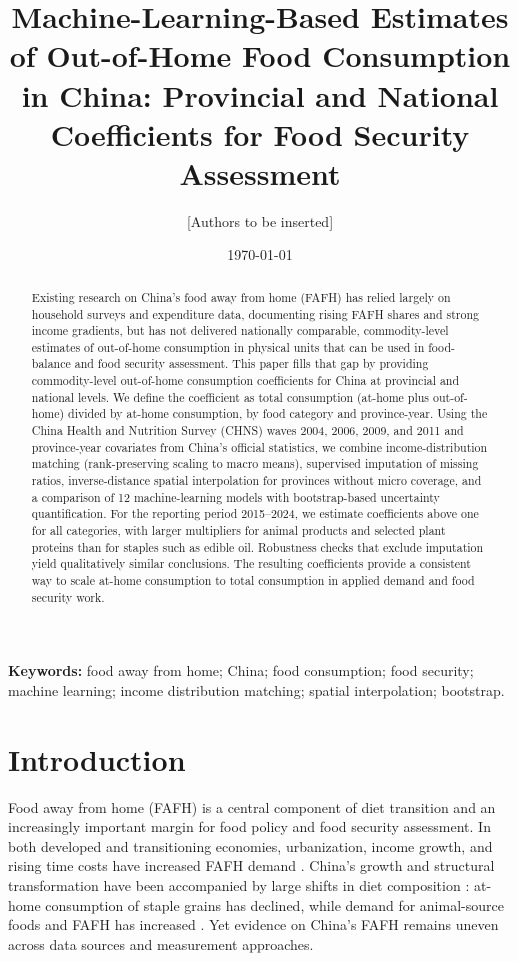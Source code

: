 \documentclass[12pt,a4paper]{article}
\title{Machine-Learning-Based Estimates of Out-of-Home Food Consumption in China: Provincial and National Coefficients for Food Security Assessment}
\author{[Authors to be inserted]}
\date{\today}
\begin{document}
\maketitle

\begin{abstract}
Existing research on China’s food away from home (FAFH) has relied largely on household surveys and expenditure data, documenting rising FAFH shares and strong income gradients, but has not delivered nationally comparable, commodity-level estimates of out-of-home consumption in physical units that can be used in food-balance and food security assessment. This paper fills that gap by providing commodity-level out-of-home consumption coefficients for China at provincial and national levels. We define the coefficient as total consumption (at-home plus out-of-home) divided by at-home consumption, by food category and province-year. Using the China Health and Nutrition Survey (CHNS) waves 2004, 2006, 2009, and 2011 and province-year covariates from China’s official statistics, we combine income-distribution matching (rank-preserving scaling to macro means), supervised imputation of missing ratios, inverse-distance spatial interpolation for provinces without micro coverage, and a comparison of 12 machine-learning models with bootstrap-based uncertainty quantification. For the reporting period 2015--2024, we estimate coefficients above one for all categories, with larger multipliers for animal products and selected plant proteins than for staples such as edible oil. Robustness checks that exclude imputation yield qualitatively similar conclusions. The resulting coefficients provide a consistent way to scale at-home consumption to total consumption in applied demand and food security work.
\end{abstract}

\noindent\textbf{Keywords:} food away from home; China; food consumption; food security; machine learning; income distribution matching; spatial interpolation; bootstrap.

\section{Introduction}
\label{sec:introduction}

Food away from home (FAFH) is a central component of diet transition and an increasingly important margin for food policy and food security assessment. In both developed and transitioning economies, urbanization, income growth, and rising time costs have increased FAFH demand \citep{Angulo2007, deBrauwHerskowitz2021, Sauer2021, StaudigelSchroeck2014}. China’s growth and structural transformation have been accompanied by large shifts in diet composition \citep{GaoZheng2020, Gould2006}: at-home consumption of staple grains has declined, while demand for animal-source foods and FAFH has increased \citep{Ma2006, MinFangLi2004, Zheng2019}. Yet evidence on China’s FAFH remains uneven across data sources and measurement approaches.
\end{document}
